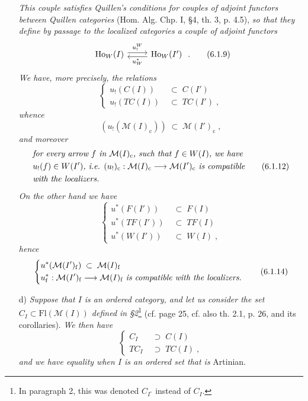 \documentclass[11pt]{article}
\newcommand{\msp}[1]{\marginpar{\footnotesize [#1]}}
\newcommand{\Fl}{\mathrm{Fl}}
\begin{document}
\begin{itemize}[leftmargin=2.5em]
\msp{page 100}
\textit{This couple satisfies Quillen's conditions for couples of adjoint functors between Quillen categories} (Hom. Alg. Chp. I, §4, th. 3, p. 4.5), \textit{so that they define by passage to the localized categories a couple of adjoint functors}
\[
\begin{tikzcd}
\mathrm{Ho}_W(I) \arrow[r, shift left, "u_!^{W}"] & \mathrm{Ho}_W(I') \arrow[l, shift left, "u^{*}_{W}"]
\end{tikzcd}
\;.
\tag*{(6.1.9)}
\]
\textit{We have, more precisely, the relations}
\[
\left\{
\begin{aligned}
u_!(C(I)) \;&\subset\; C(I')\\
u_!(TC(I)) \;&\subset\; TC(I')\;,
\end{aligned}
\right.
\tag*{(6.1.10)}
\]
\textit{whence}
\[
(u_!(\mathcal{M}(I)_{\mathrm{c}})) \;\subset\; \mathcal{M}(I')_{\mathrm{c}}\;,
\tag*{(6.1.11)}
\]
\textit{and moreover}
\[
\begin{aligned}
&\text{\textit{for every arrow $f$ in $\mathcal{M}(I)_{\mathrm{c}}$, such that $f \in W(I)$, we have}}\\
&\text{\textit{$u_!(f) \in W(I')$, i.e. $(u_!)_{\mathrm{c}} : \mathcal{M}(I)_{\mathrm{c}} \longrightarrow \mathcal{M}(I')_{\mathrm{c}}$ is compatible}}\\
&\text{\textit{with the localizers.}}
\end{aligned}
\tag*{(6.1.12)}
\]
\textit{On the other hand we have}
\[
\left\{
\begin{aligned}
u^{*}(F(I')) \;&\subset\; F(I)\\
u^{*}(TF(I')) \;&\subset\; TF(I)\\
u^{*}(W(I')) \;&\subset\; W(I)\;,
\end{aligned}
\right.
\tag*{(6.1.13)}
\]
\textit{hence}
\[
\left\{
\begin{aligned}
&u^{*}(\mathcal{M}(I')_{\mathrm{f}}) \;\subset\; \mathcal{M}(I)_{\mathrm{f}}\\
&u^{*}_{\mathrm{f}} : \mathcal{M}(I')_{\mathrm{f}} \longrightarrow \mathcal{M}(I)_{\mathrm{f}} \text{ \textit{is compatible with the localizers.}}
\end{aligned}
\right.
\tag*{(6.1.14)}
\]

\msp{page 101}
\item[d)] \textit{Suppose that $I$ is an ordered category, and let us consider the set $C_I \subset \Fl(\mathcal{M}(I))$ defined in §2}\footnote[30]{In paragraph 2, this was denoted $C_{I^{\circ}}$ instead of $C_I$.} (cf. page 25, cf. also th. 2.1, p. 26, and its corollaries). \textit{We then have}
\[
\left\{
\begin{aligned}
C_I \;&\supset\; C(I)\\
TC_I \;&\supset\; TC(I)\;,
\end{aligned}
\right.
\tag*{(6.1.15)}
\]
\textit{and we have equality when $I$ is an ordered set that is} Artinian.
\end{itemize}
\end{document}

